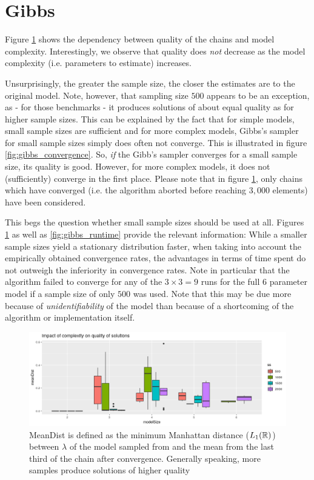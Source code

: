 

\section{Gibbs}
\label{chap:gibbs}

Figure \ref{fig:gibbs_quality} shows the dependency between quality of the chains and model complexity.  Interestingly, we observe that quality does \textit{not} decrease as the model complexity (i.e. parameters to estimate) increases. 

Unsurprisingly, the greater the sample size, the closer the estimates are to the original model. Note, however, that sampling size $500$ appears to be an exception, as - for those benchmarks - it produces solutions of about equal quality as for higher sample sizes. This can be explained by the fact that for simple models, small sample sizes are sufficient and for more complex models, Gibbs's sampler for small sample sizes simply does often not converge. This is illustrated in figure \ref{fig:gibbs_convergence}. So, \textit{if} the Gibb's sampler converges for a small sample size, its quality is good. However, for more complex models, it does not (sufficiently) converge in the first place. 
Please note that in figure \ref{fig:gibbs_quality}, only chains which have converged (i.e. the algorithm aborted before reaching $3,000$ elements) have been considered. 

This begs the question whether small sample sizes should be used at all. Figures \ref{fig:gibbs_quality} as well as \ref{fig:gibbs_runtime} provide the relevant information: While a smaller sample sizes yield a stationary distribution faster, when taking into account the empirically obtained  convergence rates, the advantages in terms of time spent do not outweigh the inferiority in convergence rates. Note in particular that the algorithm failed to converge for any of the $3\times3 =9$ runs for the full $6$ parameter model if a sample size of only $500$ was used. Note that this may be due more because of \textit{unidentifiability} of the model than because of a shortcoming of the algorithm or implementation itself. 

\begin{figure}
	\includegraphics[width=\linewidth]{img/sim_bern_gibbs_quality.png}
	\caption{MeanDist is defined as the minimum Manhattan distance ($L_1(\mathbb{R})$) between $\lambda$ of the model sampled from and the mean from the last third of the chain after convergence. Generally speaking, more samples produce solutions of higher quality }
	\label{fig:gibbs_quality}
\end{figure}


